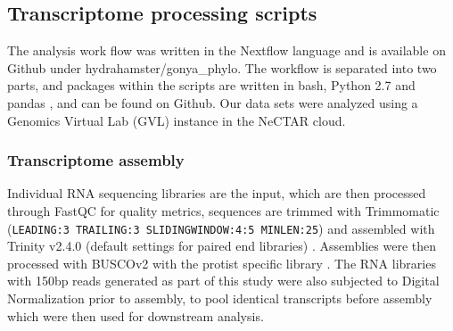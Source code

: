 \documentclass[12pt]{article}
\begin{document}
\subsection*{Transcriptome processing scripts}
The analysis work flow was written in the Nextflow language \cite{nextflow} and is available on Github under hydrahamster/gonya\_phylo. 
The workflow is separated into two parts, and packages within the scripts are written in bash, Python 2.7 \cite{python} and pandas \cite{pandas}, and can be found on Github. 
Our data sets were analyzed using a Genomics Virtual Lab (GVL) \cite{afgan2015genomics} instance in the NeCTAR cloud.
\subsubsection*{Transcriptome assembly}
Individual RNA sequencing libraries are the input, which are then processed through FastQC \cite{fastqc} for quality metrics, sequences are trimmed with Trimmomatic (\texttt{LEADING:3 TRAILING:3 SLIDINGWINDOW:4:5 MINLEN:25}) \cite{bolger2014trimmomatic} and assembled with Trinity v2.4.0 (default settings for paired end libraries) \cite{haas2013novo}. 
Assemblies were then processed with BUSCOv2 with the protist specific library \cite{simao2015busco}.
The RNA libraries with 150bp reads generated as part of this study were also subjected to Digital Normalization \cite{diginorm} prior to assembly, to pool identical transcripts before assembly which were then used for downstream analysis.                                                                                                                                                                                                                                                                                                                                                                                                                                                                                                                                                                                                                                                                                                                                                                                                                                                                                                                                                                                                                                                                                                                                                                                                                                                                                                                                        
\end{document}
